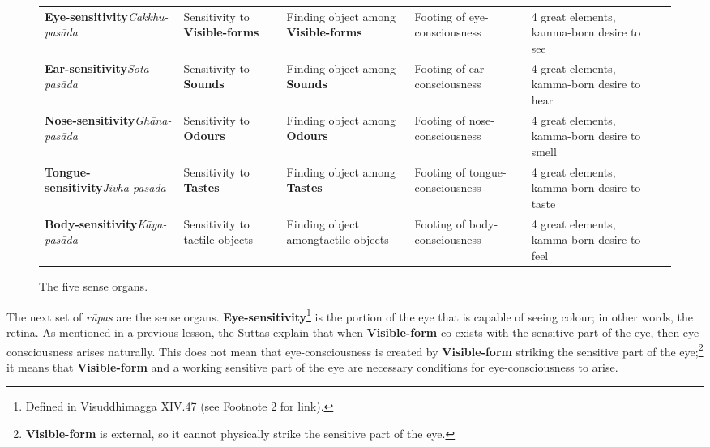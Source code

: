 \begin{figure} [H]
\setlength{\tabcolsep}{0pt}
\renewcommand{\arraystretch}{1.1}
\noindent\begin{tabular}{P{0.25\textwidth} | C{.185\textwidth} C{0.185\textwidth} C{0.185\textwidth} C{0.195\textwidth} m{0mm}}
\toprule
 &  &  &  & \\
\midrule
\textbf{Eye-sensitivity}\newline \textit{Cakkhu-pasāda} & Sensitivity to \textbf{Visible-forms} & Finding object among \textbf{Visible-forms} & Footing of eye-consciousness & 4 great elements, kamma-born desire to see &\\[9mm]
\textbf{Ear-sensitivity}\newline \textit{Sota-pasāda} & Sensitivity to \textbf{Sounds} & Finding object among \textbf{Sounds} & Footing of ear-consciousness & 4 great elements, kamma-born desire to hear &\\[9mm]
\textbf{Nose-sensitivity}\newline \textit{Ghāna-pasāda} & Sensitivity to \textbf{Odours} & Finding object among \textbf{Odours} & Footing of nose-consciousness & 4 great elements, kamma-born desire to smell &\\[9mm]
\textbf{Tongue-sensitivity}\newline \textit{Jivhā-pasāda} & Sensitivity to \textbf{Tastes} & Finding object among \textbf{Tastes} & Footing of tongue-consciousness & 4 great elements, kamma-born desire to taste &\\[9mm]
\textbf{Body-sensitivity}\newline \textit{Kāya-pasāda} & Sensitivity to tactile objects & Finding object among\newline tactile objects & Footing of body-consciousness & 4 great elements, kamma-born desire to feel &\\[9mm]
\bottomrule
\end{tabular}
\caption[]{The five sense organs.\footnotemark}
\end{figure}


The next set of \textit{rūpas} are the sense organs. \textbf{Eye-sensitivity}\footnote{Defined in Visuddhimagga XIV.47 (see Footnote 2 for link).} is the portion of the eye that is capable of seeing colour; in other words, the retina. As mentioned in a previous lesson, the Suttas explain that when \textbf{Visible-form} co-exists with the sensitive part of the eye, then eye-consciousness arises naturally. This does not mean that eye-consciousness is created by \textbf{Visible-form} striking the sensitive part of the eye;\footnote{\textbf{Visible-form} is external, so it cannot physically strike the sensitive part of the eye.} it means that \textbf{Visible-form} and a working sensitive part of the eye are necessary conditions for eye-consciousness to arise.

